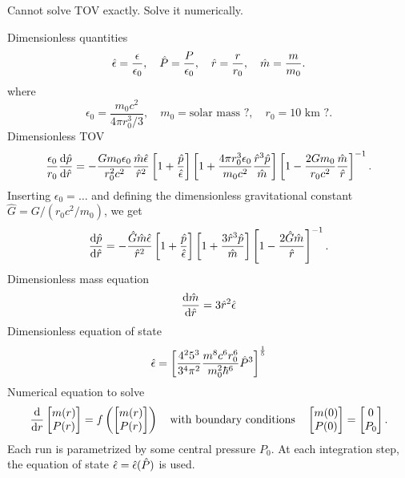 Cannot solve TOV exactly.
Solve it numerically.

Dimensionless quantities
\begin{equation}
	\hat{\epsilon} = \frac{\epsilon}{\epsilon_0}, \quad
	\hat{P} = \frac{P}{\epsilon_0}, \quad
	\hat{r} = \frac{r}{r_0}, \quad
	\hat{m} = \frac{m}{m_0}.
\end{equation}
where
\begin{equation}
	\epsilon_0 = \frac{m_0 c^2}{4 \pi r_0^3 / 3}, \quad
	m_0 = \text{solar mass ?}, \quad
	r_0 = \text{10 km ?}.
\end{equation}
Dimensionless TOV
\begin{equation}
	\frac{\epsilon_0}{r_0} \odv{\diml{p}}{\diml{r}} = -\frac{G m_0 \epsilon_0}{r_0^2 c^2} \frac{\diml{m} \diml{\epsilon}}{\diml{r}^2} \left[ 1 + \frac{\diml{p}}{\diml{\epsilon}} \right] \left[ 1 + \frac{4 \pi r_0^3 \epsilon_0}{m_0 c^2} \frac{\diml{r}^3 \diml{p}}{\diml{m}} \right] \left[ 1 - \frac{2 G m_0}{r_0 c^2} \frac{\diml{m}}{\diml{r}} \right]^{-1}.
\end{equation}
Inserting $\epsilon_0 = \ldots$ and defining the dimensionless gravitational constant $\hat{G} = G / (r_0 c^2 / m_0)$, we get
\begin{equation}
	\odv{\diml{p}}{\diml{r}} = - \frac{\diml{G} \diml{m} \diml{\epsilon}}{\diml{r}^2} \left[ 1 + \frac{\diml{p}}{\diml{\epsilon}} \right] \left[ 1 + \frac{3 \diml{r}^3 \diml{p}}{\diml{m}} \right] \left[ 1 - \frac{2 \diml{G} \diml{m}}{\diml{r}} \right]^{-1}.
\end{equation}
Dimensionless mass equation
\begin{equation}
	\odv{\diml{m}}{\diml{r}} = 3 \diml{r}^2 \diml{\epsilon}
\end{equation}
Dimensionless equation of state
\begin{equation}
	\hat{\epsilon} = \left[ \frac{4^2 5^3}{3^4 \pi^2} \frac{m^8 c^6 r_0^6}{m_0^2 \hbar^6} \hat{P}^3 \right]^{\frac{1}{5}}
\end{equation}
Numerical equation to solve
\begin{equation}
	\odv{}{r} \begin{bmatrix} m(r) \\ P(r) \\ \end{bmatrix} = f \left( \begin{bmatrix} m(r) \\ P(r) \\ \end{bmatrix} \right)
	\quad \text{with boundary conditions} \quad
	\begin{bmatrix} m(0) \\ P(0) \\ \end{bmatrix} = \begin{bmatrix} 0 \\ P_0 \\ \end{bmatrix}.
\end{equation}
Each run is parametrized by some central pressure $P_0$.
At each integration step, the equation of state $\hat{\epsilon} = \hat{\epsilon}(\hat{P})$ is used.

